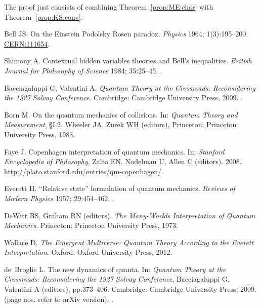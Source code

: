 \documentclass[DIV=calc,fontsize=12pt]{scrartcl} %
\theoremstyle{definition}
\theoremstyle{plain}
\begin{document}
The proof just consists of combining Theorem~\ref{prop:ME:char}
with Theorem~\ref{prop:KS:conv}.
\pagebreak
\balance
\begin{thebibliography}{10}

Bell JS.
\newblock On the Einstein Podolsky Rosen paradox.
\newblock \emph{Physics} 1964; 1(3):195--200.
\newblock \href{https://cds.cern.ch/record/111654}{CERN:111654}.

Shimony A.
\newblock Contextual hidden variables theories and {B}ell's inequalities.
\newblock \emph{British Journal for Philosophy of Science} 1984; 35:25--45.
\newblock \href {http://dx.doi.org/10.1093/bjps/35.1.25}
{}.

Bacciagaluppi G, Valentini A.
\newblock \emph{Quantum Theory at the Crossroads: Reconsidering the 1927 Solvay Conference}.
\newblock Cambridge: Cambridge University Press, 2009.
\newblock \href {http://arxiv.org/abs/quant-ph/0609184}
{}.

Born M.
\newblock On the quantum mechanics of collisions.
\newblock In: \emph{Quantum Theory and Measurement}, \S I.2. Wheeler JA, Zurek WH (editors), Princeton: Princeton University Press, 1983.

Faye J.
\newblock Copenhagen interpretation of quantum mechanics.
\newblock In: \emph{Stanford Encyclopedia of Philosophy}, Zalta EN, Nodelman U, Allen C (editors). 2008.
\newblock \url{http://plato.stanford.edu/entries/qm-copenhagen/}.

Everett H.
\newblock ``Relative state'' formulation of quantum mechanics.
\newblock \emph{Reviews of Modern Physics} 1957; 29:454--462.
\newblock \href {http://dx.doi.org/10.1103/RevModPhys.29.454}
{}.

DeWitt BS, Graham RN (editors).
\newblock \emph{The Many-Worlds Interpretation of Quantum Mechanics}.
\newblock Princeton: Princeton University Press, 1973.

Wallace D.
\newblock \emph{The Emergent Multiverse: Quantum Theory According to the Everett Interpretation}.
\newblock Oxford: Oxford University Press, 2012.

de~Broglie L.
\newblock The new dynamics of quanta.
\newblock In: \emph{Quantum Theory at the Crossroads: Reconsidering the 1927 Solvay Conference}, Bacciagaluppi G, Valentini A (editors), pp.373--406. Cambridge: Cambridge University Press, 2009.
\newblock (page nos. refer to arXiv version).
\newblock \href {http://arxiv.org/abs/quant-ph/0609184}
{}.


\end{thebibliography}
\end{document}

